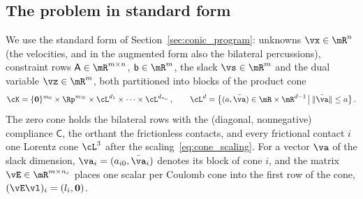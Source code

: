 \subsection{The problem in standard form}\label{sec:ec_problem}
%
We use the standard form of Section~\ref{sec:conic_program}: unknowns $\vx \in \mR^n$ (the velocities, and in the augmented form also the bilateral percussions), constraint rows $\mathsf{A} \in \mR^{m \times n}$, $\mathsf{b} \in \mR^m$, the slack $\vs \in \mR^m$ and the dual variable $\vz \in \mR^m$, both partitioned into blocks of the product cone
%
\begin{equation}\label{eq:ec_cone}
	\cK = \{\mathbf{0}\}^{m_0} \times \Rp^{m_N} \times \cL^{d_1} \times \dots \times \cL^{d_{n_c}} \, , \qquad
	\cL^{d} = \big\{(a, \bar{\va}) \in \mR \times \mR^{d-1} \, \big| \, \|\bar{\va}\| \leq a\big\} \, .
\end{equation}
%
The zero cone holds the bilateral rows with the (diagonal, nonnegative) compliance $\mathsf{C}$, the orthant the frictionless contacts, and every frictional contact $i$ one Lorentz cone $\cL^3$ after the scaling~\eqref{eq:cone_scaling}. For a vector $\va$ of the slack dimension, $\va_i = (a_{i0}, \bar{\va}_i)$ denotes its block of cone $i$, and the matrix $\vE \in \mR^{m \times n_c}$ places one scalar per Coulomb cone into the first row of the cone, $(\vE \vl)_i = (l_i, \mathbf{0})$.
%

